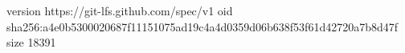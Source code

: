 version https://git-lfs.github.com/spec/v1
oid sha256:a4e0b5300020687f11151075ad19c4a4d0359d06b638f53f61d42720a7b8d47f
size 18391
